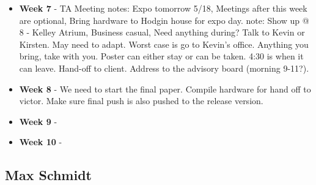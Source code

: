 \documentclass[onecolumn, draftclsnofoot,10pt, compsoc]{IEEEtran}
\begin{document}
\begin{itemize}
					\item \textbf{Week 7} - TA Meeting notes: Expo tomorrow 5/18, Meetings after this week are optional, Bring hardware to Hodgin house for expo day. note: Show up @ 8 - Kelley Atrium, Business casual, Need anything during? Talk to Kevin or Kirsten.  May need to adapt.  Worst case is go to Kevin's office. Anything you bring, take with you. Poster can either stay or can be taken. 4:30 is when it can leave. Hand-off to client. Address to the advisory board (morning 9-11?).
					\item \textbf{Week 8} -  We need to start the final paper. Compile hardware for hand off to victor. Make sure final push is also pushed to the release version.
					\item \textbf{Week 9} -
					\item \textbf{Week 10} -
				\end{itemize}
		\subsection{Max Schmidt}
\end{document}
